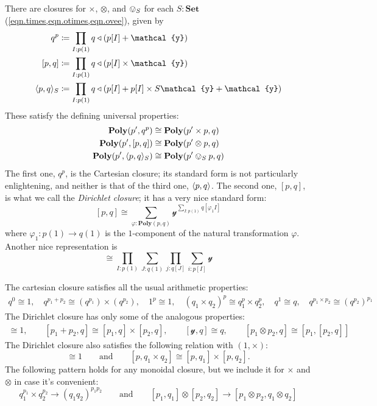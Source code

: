 \documentclass[11pt, one side, article]{memoir}
\theoremstyle{definition}
\theoremstyle{plain}
\DeclarePairedDelimiter{\present}{\langle}{\rangle}
\newcommand{\Cat}[1]{\mathbf{#1}}%
\newcommand{\smset}{\Cat{Set}}
\newcommand{\yon}{\mathcal{y}}
\newcommand{\poly}{\Cat{Poly}}
\newcommand{\0}{\textsf{0}}
\newcommand{\1}{\tn{\textsf{1}}}
\newcommand{\tri}{\mathbin{\triangleleft}}
\newcommand{\qqand}{\qquad\text{and}\qquad}
\begin{document}
There are closures for $\times$, $\otimes$, and $\ovee_S$ for each $S:\smset$ (\cref{eqn.times,eqn.otimes,eqn.ovee}),%
given by
\begin{align}
  q^p&\coloneqq \prod_{I: p(1)}q\tri(p[I]+\yon)\label{eqn.cart_cl}\\
  [p,q]&\coloneqq\prod_{I: p(1)}q\tri(p[I]\times\yon)\\
  \present{p,q}_S&\coloneqq\prod_{I: p(1)}q\tri(p[I]+p[I]\times S\yon+\yon)
\end{align}
These satisfy the defining universal properties:
\begin{align}
  \poly(p',q^p)&\cong\poly(p'\times p,q)\\
  \poly(p',[p,q])&\cong\poly(p'\otimes p,q)\\
  \poly(p',\present{p,q}_S)&\cong\poly(p'\ovee_S p,q)
\end{align}
The first one, $q^p$, is the Cartesian closure; its standard form is not particularly enlightening, and neither is that of the third one, $\present{p,q}$. The second one, $[p,q]$, is what we call the \emph{Dirichlet closure}; it has a very nice standard form:
\[
[p,q]\cong\sum_{\varphi:\poly(p,q)}\yon^{\sum\limits_{I: p(1)}q[\varphi_1I]}
\]
where $\varphi_1\colon p(1)\to q(1)$ is the $1$-component of the natural transformation $\varphi$. Another nice representation is
\begin{equation}
[p,q]\cong\prod_{I: p(1)}\sum_{J: q(1)}\prod_{j: q[J]}\sum_{i: p[I]}\yon
\end{equation}

The cartesian closure satisfies all the usual arithmetic properties:
\begin{gather}
	q^0\cong1,\quad
	q^{p_1+p_2}\cong (q^{p_1})\times(q^{p_2}),\quad
	1^p\cong 1,\quad
	(q_1\times q_2)^p\cong q_1^p\times q_2^p,\quad
	q^1\cong q,\quad
	q^{p_1\times p_2}\cong (q^{p_2})^{p_1}
\end{gather}
The Dirichlet closure has only some of the analogous properties:
\begin{gather}
	[0,p]\cong1,\qquad
	[p_1+p_2,q]\cong [p_1,q]\times[p_2,q],\qquad
	[\yon,q]\cong q,\qquad
	[p_1\otimes p_2,q]\cong[p_1,[p_2,q]]
\end{gather}
The Dirichlet closure also satisfies the following relation with $(1,\times)$:
\begin{equation}
  [p,1]\cong 1
  \qqand
  [p,q_1\times q_2]\cong[p,q_1]\times[p,q_2].
\end{equation}
The following pattern holds for any monoidal closure, but we include it for $\times$ and $\otimes$ in case it's convenient:
\begin{equation}
	q_1^{p_1}\times q_2^{p_2}\to (q_1q_2)^{p_1p_2}
	\qqand
	[p_1,q_1]\otimes[p_2,q_2]\to[p_1\otimes p_2,q_1\otimes q_2]
\end{equation}
\end{document}
